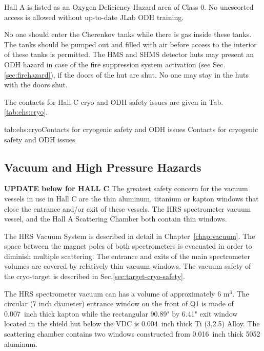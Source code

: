 Hall A is listed as an Oxygen Deficiency Hazard area of Class 0. 
No unescorted access is allowed without up-to-date JLab ODH training.

No one should enter the Cherenkov tanks while there is gas inside these tanks. 
The tanks should be pumped out and filled with air before access to the interior 
of these tanks is permitted. 
The HMS and SHMS detector huts may present an ODH hazard in case of the fire suppression 
system activation (see Sec.\ref{sec:firehazard}), if the doors of the hut are shut. 
No one may stay in the huts with the doors shut.
  
 The contacts for Hall C cryo and ODH safety issues are given in Tab.\ref{tab:ehs:cryo}.
 
 \begin{namestab}{tab:ehs:cryo}{Contacts for cryogenic safety and ODH issues}{%
   Contacts for cryogenic safety and ODH issues}
 \end{namestab}

\begin{safetyen}{0}{0}
\section{Vacuum and High Pressure Hazards} 
\label{sec:vachazard}
\end{safetyen}

\textbf{UPDATE below for HALL C}
The greatest safety concern for the vacuum vessels in use in Hall C are the thin 
aluminum, titanium or kapton windows that close the entrance and/or exit of 
these vessels. The HRS spectrometer vacuum vessel, and the Hall A Scattering Chamber 
both contain thin windows.

The HRS Vacuum System is described in detail in Chapter~\ref{chap:vacuum}. 
The space between the magnet poles of both spectrometers is evacuated in order 
to diminish multiple scattering. The entrance and exits of the main spectrometer 
volumes are covered by relatively thin vacuum windows. 
The vacuum safety of the cryo-target is described in Sec.\ref{sec:target-cryo-safety}. 

The HRS spectrometer vacuum can has a volume of approximately 6 m$^3$.
The circular (7 inch diameter) entrance window on the front of Q1 is made of 0.007~inch thick 
kapton while the rectangular 90.89" by 6.41" exit window located in the shield hut below the VDC 
is 0.004~inch thick Ti (3,2.5) Alloy. The scattering chamber contains two windows 
constructed from 0.016~inch thick 5052 aluminum.

